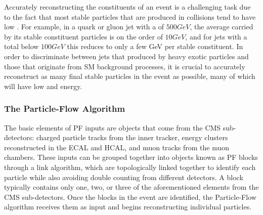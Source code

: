Accurately reconstructing the constituents of an event is a challenging task due to the fact that most stable particles that are produced in collisions tend to have low \pt.
For example, in a quark or gluon jet with a \pt of $500\unit{GeV}$, the average \pt carried by its stable constituent particles is on the order of $10\unit{GeV}$, and for jets with a total \pt below $100\unit{GeV}$ this reduces to only a few GeV per stable constituent.
In order to discriminate between jets that produced by heavy exotic particles and those that originate from SM background processes, it is crucial to accurately reconstruct as many final stable particles in the event as possible, many of which will have low \pt and energy.

\subsubsection{The Particle-Flow Algorithm}

The basic elements of PF inputs are objects that come from the CMS sub-detectors: charged particle tracks from the inner tracker, energy clusters reconstructed in the ECAL and HCAL, and muon tracks from the muon chambers.
These inputs can be grouped together into objects known as PF blocks through a link algorithm, which are topologically linked together to identify each particle while also avoiding double counting from different detectors.
A block typically contains only one, two, or three of the aforementioned elements from the CMS sub-detectors.
Once the blocks in the event are identified, the Particle-Flow algorithm receives them as input and begins reconstructing individual particles.

